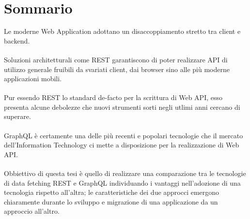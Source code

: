 
\cleardoublepage
{}
{}
\begingroup
\let\clearpage\relax
\let\cleardoublepage\relax
\let\cleardoublepage\relax

\chapter*{Sommario}
Le moderne Web Application adottano un disaccoppiamento stretto tra client e backend.\\\\
Soluzioni architetturali come REST garantiscono di poter realizzare API di utilizzo generale fruibili da svariati client, dai browser sino alle più moderne applicazioni mobili.\\\\
Pur essendo REST lo standard de-facto per la scrittura di Web API, esso presenta alcune debolezze che nuovi strumenti sorti negli utlimi anni cercano di superare.\\\\
GraphQL è certamente una delle più recenti e popolari tecnologie che il mercato dell'Information Technology ci mette a disposizione per la realizzazione di Web API.\\\\
Obbiettivo di questa tesi è quello di realizzare una comparazione tra le tecnologie di data fetching REST e GraphQL individuando i vantaggi nell'adozione di una tecnologia rispetto all'altra; le caratteristiche dei due approcci emergono chiaramente durante lo sviluppo e migrazione di una applicazione da un approccio all'altro.
\endgroup

\vfill
